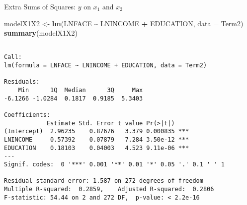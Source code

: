 \documentclass[
  ignorenonframetext,
]{beamer}
\newenvironment{Shaded}{\begin{snugshade}}{\end{snugshade}}
\newcommand{\AttributeTok}[1]{\textcolor[rgb]{0.13,0.29,0.53}{#1}}
\newcommand{\FunctionTok}[1]{\textcolor[rgb]{0.13,0.29,0.53}{\textbf{#1}}}
\newcommand{\NormalTok}[1]{#1}
\newcommand{\OtherTok}[1]{\textcolor[rgb]{0.56,0.35,0.01}{#1}}
\newcommand{\SpecialCharTok}[1]{\textcolor[rgb]{0.81,0.36,0.00}{\textbf{#1}}}
\begin{document}
\begin{frame}[fragile]{Extra Sums of Squares: \(y\) on \(x_1\) and
\(x_2\)}
\protect\hypertarget{extra-sums-of-squares-y-on-x_1-and-x_2}{}
\footnotesize

\begin{Shaded}
\begin{Highlighting}[]
\NormalTok{modelX1X2 }\OtherTok{\textless{}{-}} \FunctionTok{lm}\NormalTok{(LNFACE }\SpecialCharTok{\textasciitilde{}}\NormalTok{ LNINCOME }\SpecialCharTok{+}\NormalTok{ EDUCATION, }\AttributeTok{data =}\NormalTok{ Term2)}
\FunctionTok{summary}\NormalTok{(modelX1X2)}
\end{Highlighting}
\end{Shaded}

\begin{verbatim}

Call:
lm(formula = LNFACE ~ LNINCOME + EDUCATION, data = Term2)

Residuals:
    Min      1Q  Median      3Q     Max 
-6.1266 -1.0284  0.1817  0.9185  5.3403 

Coefficients:
            Estimate Std. Error t value Pr(>|t|)    
(Intercept)  2.96235    0.87676   3.379 0.000835 ***
LNINCOME     0.57392    0.07879   7.284 3.50e-12 ***
EDUCATION    0.18103    0.04003   4.523 9.11e-06 ***
---
Signif. codes:  0 '***' 0.001 '**' 0.01 '*' 0.05 '.' 0.1 ' ' 1

Residual standard error: 1.587 on 272 degrees of freedom
Multiple R-squared:  0.2859,    Adjusted R-squared:  0.2806 
F-statistic: 54.44 on 2 and 272 DF,  p-value: < 2.2e-16
\end{verbatim}

\normalsize
\end{frame}
\end{document}
